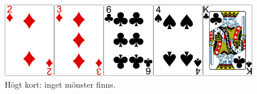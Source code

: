 \begin{figure}[H]
 \begin{minipage}[c]{\CardWidth}
  \includegraphics[width=\textwidth]{../img/w05-hands/none.png}
 \end{minipage}
 \begin{minipage}[c]{\CardCaptionWidth}
  \caption{Högt kort: inget mönster finns.}
 \label{lab:shuffle:last-picture}
  \end{minipage}
\end{figure}
